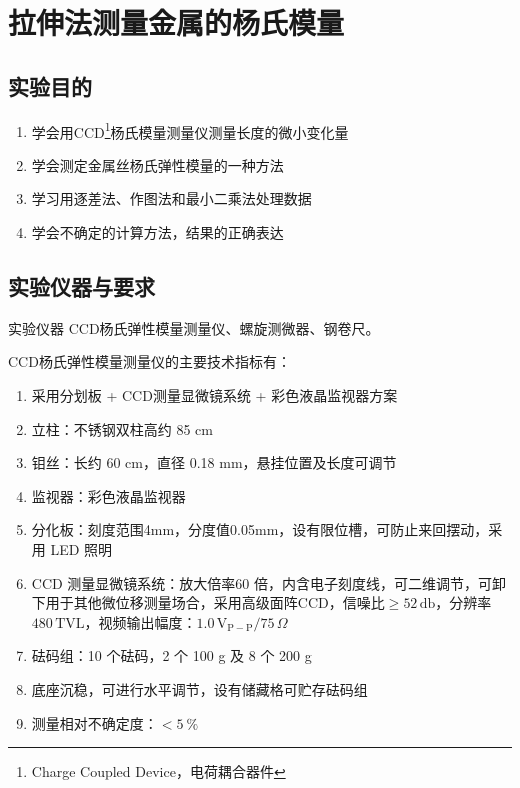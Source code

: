 \documentclass[zihao=5, UTF8]{article}
\theoremstyle{MyLineTheoremStyle} %
\theoremstyle{MyBlockTheoremStyle} %
\theoremstyle{MySubsubsectionStyle} %
\begin{document}
\section{拉伸法测量金属的杨氏模量}\thispagestyle{fancy} 

\subsection{实验目的}


\begin{enumerate}
    \item 学会用CCD\footnote{Charge Coupled Device，电荷耦合器件}杨氏模量测量仪测量长度的微小变化量
    \item 学会测定金属丝杨氏弹性模量的一种方法
    \item 学习用逐差法、作图法和最小二乘法处理数据
    \item 学会不确定的计算方法，结果的正确表达
\end{enumerate}

\subsection{实验仪器与要求}
实验仪器 CCD杨氏弹性模量测量仪、螺旋测微器、钢卷尺。

CCD杨氏弹性模量测量仪的主要技术指标有：


\begin{enumerate}[leftmargin=2cm]
    \item 采用分划板 + CCD测量显微镜系统 + 彩色液晶监视器方案
    \item 立柱：不锈钢双柱高约 85 cm
    \item 钼丝：长约 60 cm，直径 0.18 mm，悬挂位置及长度可调节
    \item 监视器：彩色液晶监视器
    \item 分化板：刻度范围4mm，分度值0.05mm，设有限位槽，可防止来回摆动，采用 LED 照明
    \item CCD 测量显微镜系统：放大倍率60 倍，内含电子刻度线，可二维调节，可卸下用于其他微位移测量场合，采用高级面阵CCD，信噪比$ \geqslant 52\,\mathrm{db} $，分辨率$ 480\,\mathrm{TVL} $，视频输出幅度：$ 1.0\,\mathrm{V_{P-P}}/75\,\Omega $
    \item  砝码组：10 个砝码，2 个 100 g 及 8 个 200 g
    \item 底座沉稳，可进行水平调节，设有储藏格可贮存砝码组
    \item 测量相对不确定度：$< 5\ \%$
\end{enumerate}
\end{document}
